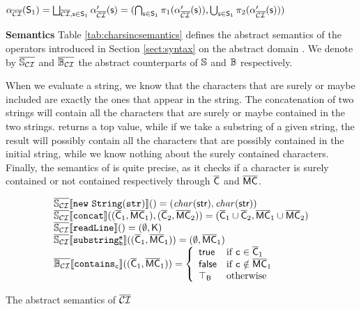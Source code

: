 \documentclass[orivec]{llncs}
\begin{document}
$\alpha_{\mathsf{\overline{\mathsf{\mathcal{CI}}}}}(\mathsf{S}_1) = \bigsqcup_{\mathsf{\overline{\mathsf{\mathcal{CI}}}}, \mathsf{s} \in \mathsf{S}_1}{\alpha_{\mathsf{\overline{\mathsf{\mathcal{CI}}}}}^\prime(\mathsf{s})} = (\bigcap_{\mathsf{s} \in \mathsf{S}_1}{\pi_1(\alpha_{\mathsf{\overline{\mathsf{\mathcal{CI}}}}}^\prime(\mathsf{s}))}, \bigcup_{\mathsf{s} \in \mathsf{S}_1}{\pi_2(\alpha_{\mathsf{\overline{\mathsf{\mathcal{CI}}}}}^\prime(\mathsf{s}))})$

\noindent \textbf{Semantics} Table \ref{tab:charsincsemantics} defines the abstract semantics of the operators introduced in Section \ref{sect:syntax} on the abstract domain \acharsinc. We denote by $\overline{\mathit{\mathbb{S}_{\mathsf{\mathcal{CI}}}}}$ and $\overline{\mathit{\mathbb{B}_{\mathsf{\mathcal{CI}}}}}$ the abstract counterparts of $\mathbb{S}$ and $\mathbb{B}$ respectively.
 

When we evaluate a string, we know that the characters that are surely or maybe included are exactly the ones that appear in the string. The concatenation of two strings will contain all the characters that are surely or maybe contained in the two strings.  returns a top value, while if we take a substring of a given string, the result will possibly contain all the characters that are possibly contained in the initial string, while we know nothing about the surely contained characters. Finally, the semantics of  is quite precise, as it checks if a character is surely contained or not contained respectively through $\mathsf{\overline{C}}$ and $\mathsf{\overline{MC}}$.

\begin{table}[t]
\footnotesize
\[
\begin{array}{l}
\mathbb{\overline{\mathit{\mathbb{S_{\mathsf{\mathcal{CI}}}}}}}\llbracket \mathtt{\mathtt{new\ String(str)}} \rrbracket() = ( \mathit{char}(\mathsf{str}), \mathit{char}(\mathsf{str}) )\\
\mathbb{\overline{\mathit{\mathbb{S_{\mathsf{\mathcal{CI}}}}}}}\llbracket \mathtt{\mathtt{concat}} \rrbracket((\mathsf{\overline{C}}_1, \mathsf{\overline{MC}}_1), (\mathsf{\overline{C}}_2, \mathsf{\overline{MC}}_2)) = (\mathsf{\overline{C}}_1 \cup \mathsf{\overline{C}}_2, \mathsf{\overline{MC}}_1 \cup \mathsf{\overline{MC}}_2 )\\
\mathbb{\overline{\mathit{\mathbb{S_{\mathsf{\mathcal{CI}}}}}}}\llbracket \mathtt{\mathtt{readLine}} \rrbracket() =  (\emptyset, \mathsf{K})\\
\mathbb{\overline{\mathit{\mathbb{S_{\mathsf{\mathcal{CI}}}}}}}\llbracket \mathtt{\mathtt{substring_b^e}} \rrbracket((\mathsf{\overline{C}}_1,\mathsf{\overline{MC}}_1)) = (\emptyset,\mathsf{\overline{MC}}_1)\\
\mathbb{\overline{\mathit{\mathbb{B_{\mathsf{\mathcal{CI}}}}}}}\llbracket \mathtt{\mathtt{contains_c}} \rrbracket((\mathsf{\overline{C}}_1,\mathsf{\overline{MC}}_1)) = \left\{ \begin{array}{ll}
\mathsf{true} & \mbox{if } \mathtt{c} \in \mathsf{\overline{C}}_1 \\
\mathsf{false} & \mbox{if } \mathtt{c} \notin \mathsf{\overline{MC}}_1\\
\mathsf{\top_B} & \mbox{otherwise}
\end{array}
\right.\\
\end{array}
\]
\caption{The abstract semantics of $\mathsf{\overline{\mathsf{\mathcal{CI}}}}$}
\label{tab:charsincsemantics}
\end{table}
 
\end{document}
